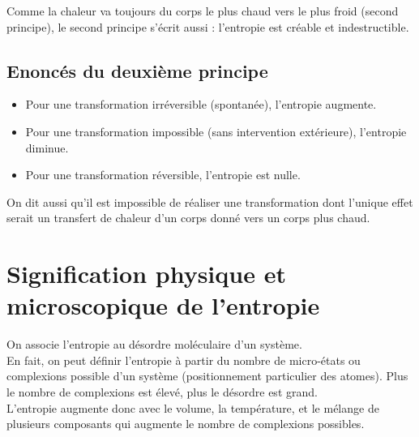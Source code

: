 \documentclass[13pt, twoside, a4paper, french]{report}
\begin{document}

                Comme la chaleur va toujours du corps le plus chaud vers le plus froid (second principe), le second principe s'écrit aussi :
                l'entropie est créable et indestructible.

            \subsection{Enoncés du deuxième principe}

                \begin{itemize}
                    \item Pour une transformation irréversible (spontanée), l'entropie augmente.
                    \item Pour une transformation impossible (sans intervention extérieure), l'entropie diminue.
                    \item Pour une transformation réversible, l'entropie est nulle.\vspace{5pt}
                \end{itemize}
                On dit aussi qu'il est impossible de réaliser une transformation dont l'unique effet serait un transfert de chaleur d'un corps donné vers un corps plus chaud.

        \section{Signification physique et microscopique de l’entropie}

            On associe l'entropie au désordre moléculaire d'un système.\\
            En fait, on peut définir l'entropie à partir du nombre de micro-états ou complexions possible d'un système (positionnement particulier des atomes). Plus le nombre de complexions est élevé, plus le désordre est grand.\\
            L'entropie augmente donc avec le volume, la température, et le mélange de plusieurs composants qui augmente le nombre de complexions possibles.\\
\end{document}
